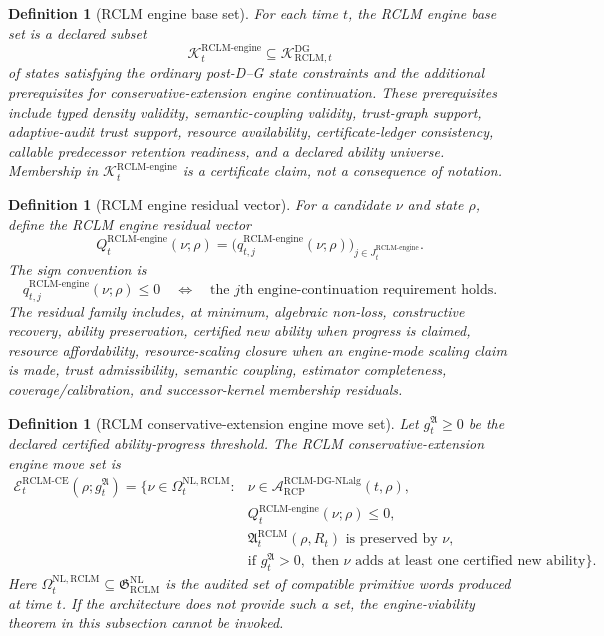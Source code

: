 \documentclass[11pt,a4paper]{article}
\newtheorem{definition}[theorem]{Definition}
\newcommand{\Acal}{\mathcal A}
\newcommand{\Kcal}{\mathcal K}
\newcommand{\RCP}{\mathrm{RCP}}
\newcommand{\RCLM}{\mathrm{RCLM}}
\newcommand{\DG}{\mathrm{DG}}
\newcommand{\engine}{\mathrm{engine}}
\newcommand{\NL}{\mathrm{NL}}
\newcommand{\NLalg}{\mathrm{NLalg}}
\newcommand{\CE}{\mathrm{CE}}
\begin{document}
\begin{definition}[RCLM engine base set]
\label{def:rclm-engine-base-set}
For each time \(t\), the RCLM engine base set is a declared subset
\[
\Kcal_t^{\RCLM\text{-}\engine}
\subseteq
\Kcal_{\RCLM,t}^{\DG}
\]
of states satisfying the ordinary post-D--G state constraints and the additional prerequisites for conservative-extension engine continuation.  These prerequisites include typed density validity, semantic-coupling validity, trust-graph support, adaptive-audit trust support, resource availability, certificate-ledger consistency, callable predecessor retention readiness, and a declared ability universe.  Membership in \(\Kcal_t^{\RCLM\text{-}\engine}\) is a certificate claim, not a consequence of notation.
\end{definition}

\begin{definition}[RCLM engine residual vector]
\label{def:rclm-engine-residual-vector}
For a candidate \(\nu\) and state \(\rho\), define the RCLM engine residual vector
\[
Q_t^{\RCLM\text{-}\engine}(\nu;\rho)
=
\bigl(q_{t,j}^{\RCLM\text{-}\engine}(\nu;\rho)\bigr)_{j\in J_t^{\RCLM\text{-}\engine}}.
\]
The sign convention is
\[
q_{t,j}^{\RCLM\text{-}\engine}(\nu;\rho)\le0
\quad\Longleftrightarrow\quad
\text{the }j\text{th engine-continuation requirement holds.}
\]
The residual family includes, at minimum, algebraic non-loss, constructive recovery, ability preservation, certified new ability when progress is claimed, resource affordability, resource-scaling closure when an engine-mode scaling claim is made, trust admissibility, semantic coupling, estimator completeness, coverage/calibration, and successor-kernel membership residuals.
\end{definition}

\begin{definition}[RCLM conservative-extension engine move set]
\label{def:rclm-ce-engine-move-set}
Let \(g_t^{\mathfrak A}\ge0\) be the declared certified ability-progress threshold.  The RCLM conservative-extension engine move set is
\[
\begin{aligned}
\mathcal E_t^{\RCLM\text{-}\CE}(\rho;g_t^{\mathfrak A})
=
\{\nu\in\Omega_t^{\NL,\RCLM}:{}&
\nu\in\Acal_{\RCP}^{\RCLM\text{-}\DG\text{-}\NLalg}(t,\rho),\\
&Q_t^{\RCLM\text{-}\engine}(\nu;\rho)\le0,\\
&\mathfrak A_t^{\RCLM}(\rho,R_t)
\text{ is preserved by }\nu,\\
&\text{if }g_t^{\mathfrak A}>0,\text{ then }\nu
\text{ adds at least one certified new ability}\}.
\end{aligned}
\]
Here \(\Omega_t^{\NL,\RCLM}\subseteq\mathfrak G_{\RCLM}^{\NL}\) is the audited set of compatible primitive words produced at time \(t\).  If the architecture does not provide such a set, the engine-viability theorem in this subsection cannot be invoked.
\end{definition}
\end{document}
